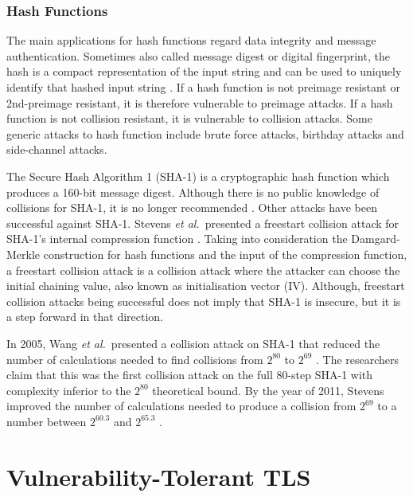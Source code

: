 \documentclass{sig-alternate-05-2015}
\begin{document}
\subsubsection{Hash Functions}

The main applications for hash functions %
regard data integrity and message authentication. Sometimes also called message digest or digital fingerprint, the hash is a compact representation of the input string and can be used to uniquely identify that hashed input string \cite{Menezes1996-ch9}.
If a hash function is not preimage resistant or 2nd-preimage resistant, it is therefore vulnerable to preimage attacks. If a hash function is not collision resistant, it is vulnerable to collision attacks.
Some generic attacks to hash function include brute force attacks, birthday attacks and side-channel attacks.

The Secure Hash Algorithm 1 (SHA-1) is a cryptographic hash function which produces a 160-bit message digest. Although there is no public knowledge of collisions for SHA-1, it is no longer recommended \cite{ENISA:14}.
Other attacks have been successful against SHA-1. Stevens \emph{et al.}~presented a freestart collision attack for SHA-1's internal compression function \cite{Stevens15}. Taking into consideration the Damgard-Merkle \cite{Merkle79} construction for hash functions and the input of the compression function, a freestart collision attack is a collision attack where the attacker can choose the initial chaining value, also known as initialisation vector (IV). Although, freestart collision attacks being successful does not imply that SHA-1 is insecure, but it is a step forward in that direction.

In 2005, Wang \emph{et al.}~presented a collision attack on SHA-1 that reduced the number of calculations needed to find collisions from $2^{80}$ to $2^{69}$ \cite{Wang05}. The researchers claim that this was the first collision attack on the full 80-step SHA-1 with complexity inferior to the $2^{80}$ theoretical bound. By the year of 2011, Stevens improved the number of calculations needed to produce a collision from $2^{69}$ to a number between $2^{60.3}$ and $2^{65.3}$ \cite{Stevens11}.



\section{Vulnerability-Tolerant TLS}
\label{sec-vtTLS}
\end{document}
